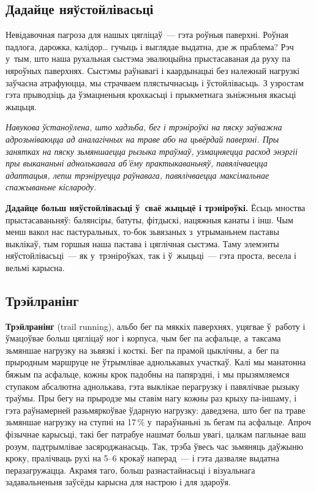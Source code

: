 \subsection*{Дадайце няўстойлівасьці}

Невідавочная пагроза для нашых цягліцаў~--- гэта роўныя паверхні. Роўная падлога, дарожка, калідор… гучыць і выглядае выдатна, дзе ж праблема? Рэч у~тым, што наша рухальная сыстэма эвалюцыйна прыстасаваная да руху па няроўных паверхнях. Сыстэмы раўнавагі і каардынацыі без належнай нагрузкі заўчасна атрафуюцца, мы страчваем плястычнасьць і ўстойлівасьць. З узростам гэта прыводзіць да ўзмацненьня крохкасьці і прыкметнага зьніжэньня якасьці жыцьця.

\emph{Навукова ўстаноўлена, што хадзьба, бег і трэніроўкі на пяску заўважна адрозьніваюцца ад аналагічных на траве або на цьвёрдай паверхні. Пры занятках на пяску зьмяншаецца рызыка траўмаў, узмацняецца расход энэргіі пры выкананьні аднолькавага аб'ёму практыкаваньняў, павялічваецца адаптацыя, лепш трэніруецца раўнавага, павялічваецца максімальнае спажываньне кіслароду.}

\textbf{Дадайце больш няўстойлівасьці ў~сваё жыцьцё і трэніроўкі.} Ёсьць мноства прыстасаваньняў: балянсіры, батуты, фітдыскі, нацяжныя канаты і інш. Чым менш вакол нас пастуральных, то-бок зьвязаных з~утрыманьнем паставы выклікаў, тым горшыя наша пастава і цяглічная сыстэма. Таму элемэнты няўстойлівасьці~--- як у~трэніроўках, так і ў~жыцьці~--- гэта проста, весела і вельмі карысна.

\subsection*{Трэйлранінг}

\textbf{Трэйлранінг} (trail running), альбо бег па мяккіх паверхнях, уцягвае ў~работу і ўмацоўвае больш цягліцаў ног і корпуса, чым бег па асфальце, а~таксама зьмяншае нагрузку на зьвязкі і косткі. Бег па прамой цыклічны, а~бег па прыродным маршруце не ўтрымлівае аднолькавых участкаў. Калі мы манатонна бяжым па асфальце, кожны крок падобны на папярэдні, і мы прызямляемся ступаком абсалютна аднолькава, гэта выклікае перагрузку і павялічвае рызыку траўмы. Пры бегу на прыродзе мы ставім нагу кожны раз крыху па-іншаму, і гэта раўнамерней разьмяркоўвае ўдарную нагрузку: даведзена, што бег па траве зьмяншае нагрузку на ступні на 17\,\% у~параўнаньні зь бегам па асфальце. Апроч фізычнае карысьці, такі бег патрабуе нашмат больш увагі, цалкам паглынае ваш розум, падтрымлівае засяроджанасьць. Так, трэба ўвесь час зьмяняць даўжыню кроку, пралічваць рухі на 5--6 крокаў наперад~--- і гэта дазваляе выдатна перазагружацца. Акрамя таго, больш разнастайнасьці і візуальнага задавальненьня заўсёды карысна для настрою і для здароўя.


